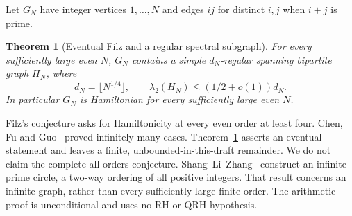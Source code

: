 \documentclass[11pt]{article}
\newtheorem{theorem}{Theorem}[section]
\theoremstyle{remark}
\begin{document}
Let \(G_N\) have integer vertices \(1,\ldots,N\) and edges
\(ij\) for distinct \(i,j\) when \(i+j\) is prime.

\begin{theorem}[Eventual Filz and a regular spectral subgraph]
\label{thm:filz}
For every sufficiently large even \(N\), \(G_N\) contains a simple
\(d_N\)-regular spanning bipartite graph \(H_N\), where
\[
 d_N=\lfloor N^{1/4}\rfloor,\qquad
 \lambda_2(H_N)\leq(1/2+o(1))d_N.                            \tag{4}
\]
In particular \(G_N\) is Hamiltonian for every sufficiently large
even \(N\).
\end{theorem}

Filz's conjecture asks for Hamiltonicity at every even order at
least four. Chen, Fu and Guo~\cite{CFG} proved infinitely many cases.
Theorem~\ref{thm:filz} asserts an eventual statement and leaves a finite,
unbounded-in-this-draft remainder. We do not claim the complete
all-orders conjecture.
Shang--Li--Zhang~\cite{SLZ} construct an infinite prime circle,
a two-way ordering of all positive integers. That result concerns
an infinite graph, rather than every sufficiently large finite order. The arithmetic proof is unconditional and
uses no RH or QRH hypothesis.
\end{document}
